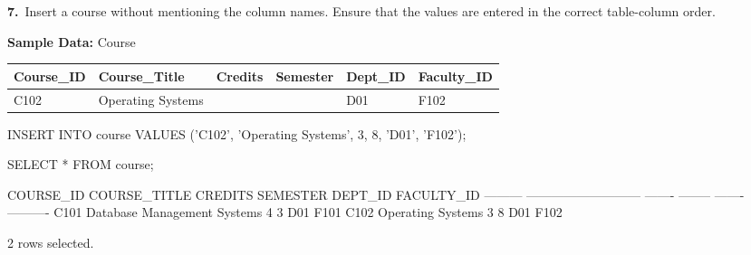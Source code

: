 \noindent\begin{minipage}{\linewidth}
\begingroup{}
{\fontsize{14}{17}\selectfont\textbf{7.}}\ Insert a course without mentioning the column names. Ensure that the values are entered in the correct table-column order.\par
\endgroup\vspace{12pt}

\noindent\textbf{Sample Data:} Course\par
\vspace{6pt}
{\small\setlength{\tabcolsep}{4pt}
\renewcommand{\arraystretch}{1.25}
\noindent\begin{tabular}{|>{\raggedright\arraybackslash}p{75.7pt}|>{\raggedright\arraybackslash}p{107.8pt}|>{\raggedleft\arraybackslash}p{59.0pt}|>{\raggedleft\arraybackslash}p{67.2pt}|>{\raggedright\arraybackslash}p{64.7pt}|>{\raggedright\arraybackslash}p{77.6pt}|}
\hline
\textbf{Course\_ID} & \textbf{Course\_Title} & \textbf{Credits} & \textbf{Semester} & \textbf{Dept\_ID} & \textbf{Faculty\_ID} \\ \hline
C102 & Operating Systems & 3 & 8 & D01 & F102 \\ \hline
\end{tabular}\par}
\vspace{14pt}

\begin{sqlcode}
INSERT INTO course
VALUES ('C102', 'Operating Systems', 3, 8, 'D01', 'F102');

SELECT * FROM course;
\end{sqlcode}

\vspace{18pt}


\begin{sqlout}[fontsize=\small]
COURSE_ID  COURSE_TITLE                 CREDITS  SEMESTER  DEPT_ID  FACULTY_ID
---------  ---------------------------  -------  --------  -------  ----------
C101       Database Management Systems        4         3  D01      F101
C102       Operating Systems                  3         8  D01      F102

2 rows selected.
\end{sqlout}
\end{minipage}\par\vspace{24pt}

